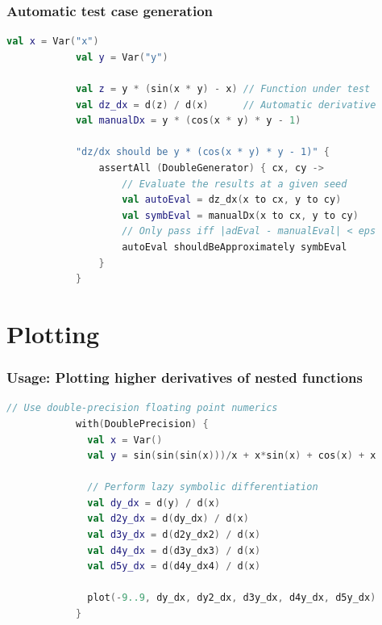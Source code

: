 \documentclass{beamer}
\begin{document}
    \begin{frame}[fragile]
        \frametitle{Automatic test case generation}
        \begin{lstlisting}[language=Kotlin, gobble=12]
            val x = Var("x")
            val y = Var("y")

            val z = y * (sin(x * y) - x) // Function under test
            val dz_dx = d(z) / d(x)      // Automatic derivative
            val manualDx = y * (cos(x * y) * y - 1)

            "dz/dx should be y * (cos(x * y) * y - 1)" {
                assertAll (DoubleGenerator) { cx, cy ->
                    // Evaluate the results at a given seed
                    val autoEval = dz_dx(x to cx, y to cy)
                    val symbEval = manualDx(x to cx, y to cy)
                    // Only pass iff |adEval - manualEval| < eps
                    autoEval shouldBeApproximately symbEval
                }
            }
        \end{lstlisting}
    \end{frame}

    \section{Plotting}

    \begin{frame}[fragile]
        \frametitle{Usage: Plotting higher derivatives of nested functions}
        \begin{lstlisting}[language=Kotlin, gobble=12]
            // Use double-precision floating point numerics
            with(DoublePrecision) {
              val x = Var()
              val y = sin(sin(sin(x)))/x + x*sin(x) + cos(x) + x

              // Perform lazy symbolic differentiation
              val dy_dx = d(y) / d(x)
              val d2y_dx = d(dy_dx) / d(x)
              val d3y_dx = d(d2y_dx2) / d(x)
              val d4y_dx = d(d3y_dx3) / d(x)
              val d5y_dx = d(d4y_dx4) / d(x)

              plot(-9..9, dy_dx, dy2_dx, d3y_dx, d4y_dx, d5y_dx)
            }
        \end{lstlisting}
    \end{frame}
\end{document}
